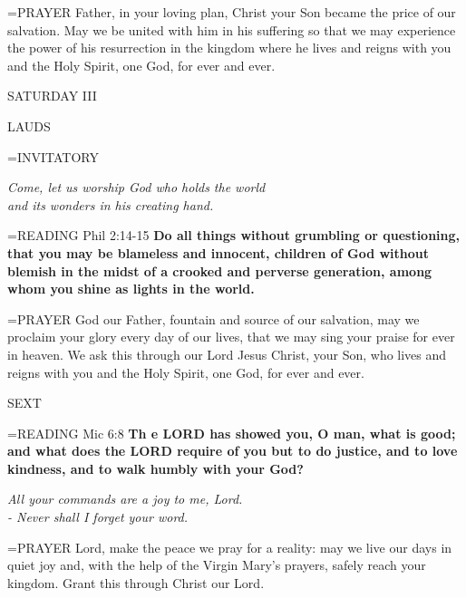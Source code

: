 \hangindent=\parindent \small{PRAYER  Father, in your loving plan, Christ your Son became the price of our salvation. May we be united with him in his suffering so that we may experience the power of his resurrection in the kingdom where he lives and reigns with you and the Holy Spirit, one God, for ever and ever.}

\begin{center}
\normalsize SATURDAY III
\end{center}

\begin{flushleft}\normalsize LAUDS\\\end{flushleft}

\hangindent=\parindent \small{INVITATORY}
\begin{center}
\textit{Come, let us worship God who holds the world\\}
\textit{and its wonders in his creating hand.\\}
\end{center}

\hangindent=\parindent \small{READING} Phil 2:14-15 \textbf{Do all things without grumbling or questioning, that you may be blameless and innocent, children of God without blemish in the midst of a crooked and perverse generation, among whom you shine as lights in the world.\\}

\hangindent=\parindent \small{PRAYER  God our Father, fountain and source of our salvation, may we proclaim your glory every day of our lives, that we may sing your praise for ever in heaven. We ask this through our Lord Jesus Christ, your Son, who lives and reigns with you and the Holy Spirit, one God, for ever and ever.}

\begin{flushleft}\normalsize SEXT\\\end{flushleft}

\hangindent=\parindent \small{READING} Mic 6:8 \textbf{Th e LORD has showed you, O man, what is good; and what does the LORD require of you but to do justice, and to love kindness, and to walk humbly with your God? }

\begin{center}
\textit{All your commands are a joy to me, Lord.\\
- Never shall I forget your word.}
\end{center}

\hangindent=\parindent \small{PRAYER  Lord, make the peace we pray for a reality: may we live our days in quiet joy and, with the help of the Virgin Mary’s prayers, safely reach your kingdom. Grant this through Christ our Lord.  }
